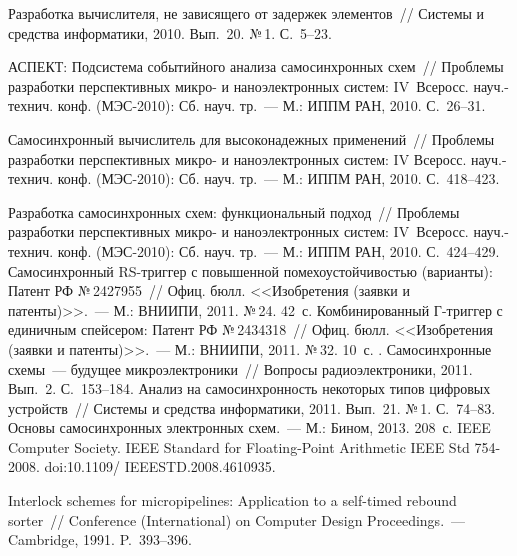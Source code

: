 \begin{multicols}{2}
{{\begin{thebibliography}{99}
 Разработка вычислителя, не зависящего от задержек элементов~// 
Системы и средства информатики, 2010. Вып.~20. №\,1. С.~5--23.

 АСПЕКТ: Подсистема 
событийного анализа самосинхронных схем~//  Проблемы разработки перспективных 
микро- и наноэлектронных сис\-тем: IV~Всеросс. науч.-технич. конф. (МЭС-2010): 
Сб. науч. тр.~--- М.: ИППМ РАН, 2010. С.~26--31. 

 Самосинхронный вычислитель для высоконадежных применений~// 
Проблемы разработки перспективных микро- и наноэлектронных сис\-тем: IV Всеросс. 
науч.-технич. конф. (МЭС-2010): Сб. науч. тр.~--- М.: ИППМ РАН, 2010. 
С.~418--423. 

 Разработка самосинхронных схем: функциональный подход~// 
Проблемы разработки перспективных микро- и наноэлектронных сис\-тем: IV~Всеросс. 
науч.-технич. конф. (МЭС-2010): Сб. науч. тр.~--- М.: ИППМ РАН, 2010. 
С.~424--429.
 Самосинхронный RS-триг\-гер с 
повышенной помехоустойчивостью (варианты): Патент РФ №\,2427955~// Офиц. бюлл. 
<<Изобретения (заявки и патенты)>>.~--- М.: ВНИИПИ, 2011. №\,24. 42~с.
 Комбинированный Г-триг\-гер с единичным спейсером: Патент РФ 
№\,2434318~// Офиц. бюлл. <<Изобретения (заявки и патенты)>>.~--- М.: ВНИИПИ, 
2011. №\,32. 10~с.
. Самосинхронные схемы~--- 
будущее микроэлектроники~// Вопросы радиоэлектроники, 2011. Вып.~2. С.~153--184.
 Анализ 
на самосинхронность некоторых типов цифровых устройств~// Сис\-те\-мы и средства 
информатики, 2011. Вып.~21. №\,1. С.~74--83.
 Основы самосинхронных электронных схем.~--- М.: Бином, 2013. 
208~с.
IEEE Computer Society. IEEE Standard for Floating-Point Arithmetic IEEE Std 
754-2008. doi:10.1109/ IEEESTD.2008.4610935.


 Interlock schemes for micropipelines: 
Application to a self-timed rebound sorter~// Conference (International) on Computer Design 
Proceedings.~--- Cambridge, 1991. P.~393--396.


\end{thebibliography}}}
\end{multicols}

